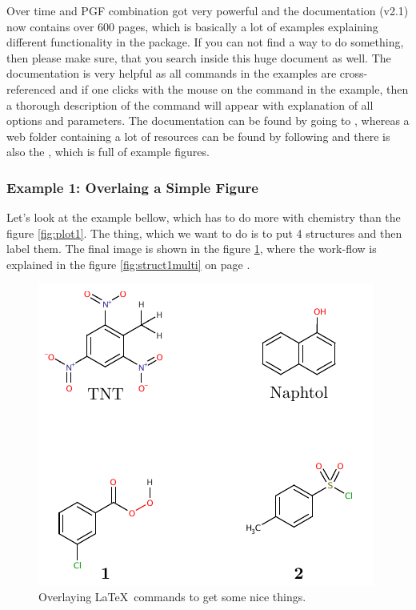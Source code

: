 \documentclass[
]{scrartcl}
\begin{document}
%
Over time  and PGF combination got very powerful and the documentation
    (v2.1) now contains over 600 pages, which is basically a lot of examples
    explaining different functionality in the package.
%
If you can not find a way to do something, then please make sure, that you
    search inside this huge document as well.
%
The documentation is very helpful as all commands in the examples are
    cross-referenced and if one clicks with the mouse on the command in the
    example, then a thorough description of the command will appear with
    explanation of all options and parameters.
%
The documentation can be found by going to
    , whereas a web folder containing a lot of resources can be found by
    following  and there is also the , which
    is full of  example figures.

%
\clearpage
\subsubsection{Example 1: Overlaing a Simple Figure}

%
Let's look at the example bellow, which has to do more with chemistry than the
    figure \ref{fig:plot1}.
%
The thing, which we want to do is to put 4 structures and then label them.
%
The final image is shown in the figure \ref{fig:struct1}, where the work-flow
    is explained in the figure \ref{fig:struct1multi} on page
    \pageref{fig:struct1multi}.

%
\begin{figure}[h]
    \centering
    \includegraphics{fig3-2.pdf}
    \caption{Overlaying \LaTeX\ commands to get some nice things.}
    \label{fig:struct1}
\end{figure}
\end{document}
